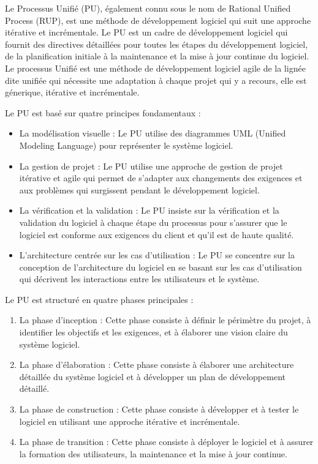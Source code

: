 Le Processus Unifié (PU), également connu sous le nom de Rational Unified Process (RUP), est une méthode de développement logiciel qui suit une approche itérative et incrémentale. Le PU est un cadre de développement logiciel qui fournit des directives détaillées pour toutes les étapes du développement logiciel, de la planification initiale à la maintenance et la mise à jour continue du logiciel.
Le processus Unifié est une méthode de développement logiciel agile de la lignée dite unifiée
qui nécessite une adaptation à chaque projet qui y a recours, elle est génerique, itérative
et incrémentale.

Le PU est basé sur quatre principes fondamentaux :
\begin{itemize}
    \item La modélisation visuelle : Le PU utilise des diagrammes UML (Unified Modeling Language) pour représenter le système logiciel.
    \item La gestion de projet : Le PU utilise une approche de gestion de projet itérative et agile qui permet de s'adapter aux changements des exigences et aux problèmes qui surgissent pendant le développement logiciel.
    \item La vérification et la validation : Le PU insiste sur la vérification et la validation du logiciel à chaque étape du processus pour s'assurer que le logiciel est conforme aux exigences du client et qu'il est de haute qualité.
    \item L'architecture centrée sur les cas d'utilisation : Le PU se concentre sur la conception de l'architecture du logiciel en se basant sur les cas d'utilisation qui décrivent les interactions entre les utilisateurs et le système.
\end{itemize}

Le PU est structuré en quatre phases principales :
\begin{enumerate}
    \item La phase d'inception : Cette phase consiste à définir le périmètre du projet, à identifier les objectifs et les exigences, et à élaborer une vision claire du système logiciel.
    \item La phase d'élaboration : Cette phase consiste à élaborer une architecture détaillée du système logiciel et à développer un plan de développement détaillé.
    \item La phase de construction : Cette phase consiste à développer et à tester le logiciel en utilisant une approche itérative et incrémentale.
    \item La phase de transition : Cette phase consiste à déployer le logiciel et à assurer la formation des utilisateurs, la maintenance et la mise à jour continue.
\end{enumerate}